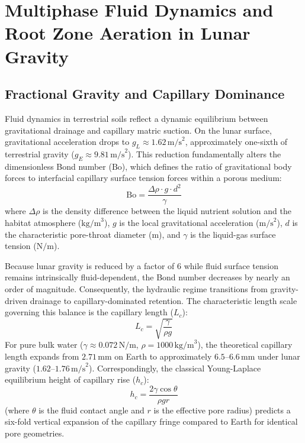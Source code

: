 \section{Multiphase Fluid Dynamics and Root Zone Aeration in Lunar Gravity}
\label{sec:fluid_dynamics}

\subsection{Fractional Gravity and Capillary Dominance}
\label{subsec:fractional_gravity}

Fluid dynamics in terrestrial soils reflect a dynamic equilibrium between gravitational drainage and capillary matric suction\cite{steinberg2007fluid,jones1999microgravity}. On the lunar surface, gravitational acceleration drops to $g_L \approx 1.62\,\mathrm{m/s}^2$, approximately one-sixth of terrestrial gravity ($g_E \approx 9.81\,\mathrm{m/s}^2$)\cite{ming1989lunar}. This reduction fundamentally alters the dimensionless Bond number ($\mathrm{Bo}$), which defines the ratio of gravitational body forces to interfacial capillary surface tension forces within a porous medium\cite{ming1989lunar,ostrach1982low}:
\begin{equation}
    \mathrm{Bo} = \frac{\Delta\rho \cdot g \cdot d^2}{\gamma}
    \label{eq:bond_number}
\end{equation}
where $\Delta\rho$ is the density difference between the liquid nutrient solution and the habitat atmosphere ($\mathrm{kg/m}^3$), $g$ is the local gravitational acceleration ($\mathrm{m/s}^2$), $d$ is the characteristic pore-throat diameter ($\mathrm{m}$), and $\gamma$ is the liquid-gas surface tension ($\mathrm{N/m}$)\cite{ming1989lunar,jones1999microgravity}.

Because lunar gravity is reduced by a factor of 6 while fluid surface tension remains intrinsically fluid-dependent, the Bond number decreases by nearly an order of magnitude\cite{ming1989lunar,ostrach1982low,podolsky1994peculiarities}. Consequently, the hydraulic regime transitions from gravity-driven drainage to capillary-dominated retention\cite{ming1989lunar,podolsky1994peculiarities}. The characteristic length scale governing this balance is the capillary length ($L_c$):
\begin{equation}
    L_c = \sqrt{\frac{\gamma}{\rho g}}
    \label{eq:capillary_length}
\end{equation}
For pure bulk water ($\gamma \approx 0.072\,\mathrm{N/m}$, $\rho = 1000\,\mathrm{kg/m}^3$), the theoretical capillary length expands from $2.71\,\mathrm{mm}$ on Earth to approximately $6.5\text{--}6.6\,\mathrm{mm}$ under lunar gravity ($1.62\text{--}1.76\,\mathrm{m/s}^2$). Correspondingly, the classical Young-Laplace equilibrium height of capillary rise ($h_c$):
\begin{equation}
    h_c = \frac{2\gamma \cos\theta}{\rho g r}
    \label{eq:capillary_rise}
\end{equation}
(where $\theta$ is the fluid contact angle and $r$ is the effective pore radius) predicts a six-fold vertical expansion of the capillary fringe compared to Earth for identical pore geometries\cite{ming1989lunar,steinberg2007fluid}.

